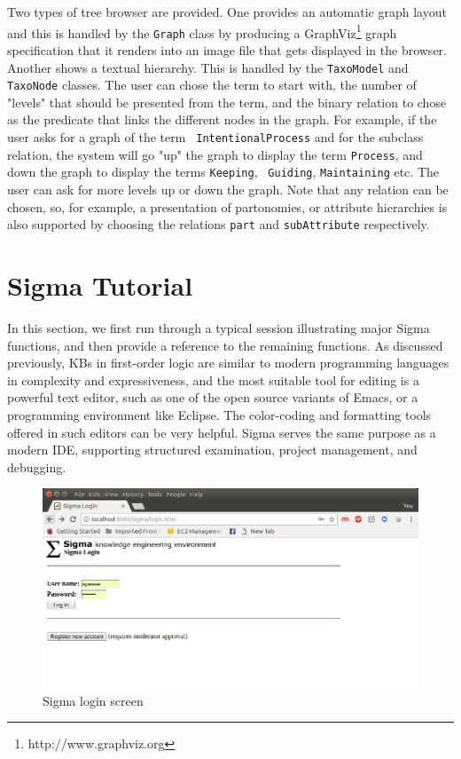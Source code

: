 \documentclass{book}
\begin{document}
Two types of tree browser are provided. One provides an automatic graph layout
and this is handled by the \texttt{Graph} class by
producing a GraphViz\footnote{http://www.graphviz.org} graph specification that
it renders into an image file that gets displayed in the browser. Another shows
a textual hierarchy. This is handled by the
\texttt{TaxoModel} and
\texttt{TaxoNode} classes. The user can chose the term
to start with, the number of "levels" that should be presented from the term,
and the binary relation to chose as the predicate that links the different nodes
in the graph. For example, if the user asks for a graph of the term {\tt
IntentionalProcess} and for the subclass relation, the
system will go "up" the graph to display the term {\tt Process}, and down the
graph to display the terms {\tt Keeping}, {\tt
Guiding}, {\tt Maintaining} etc. The user can
ask for more levels up or down the graph. Note that any relation can be chosen,
so, for example, a presentation of partonomies, or attribute
hierarchies is also supported by choosing the relations {\tt part}
and {\tt subAttribute} respectively.

\section{Sigma Tutorial}
\label{chap:KnowEngi:sec:Tuto}

In this section, we first run through a typical session illustrating major Sigma
functions, and then provide a reference to the remaining functions.  As
discussed previously, KBs in first-order logic are similar to modern programming
languages in complexity and expressiveness, and the most suitable tool for
editing is a powerful text editor, such as one of the open source variants of
Emacs, or a programming environment like Eclipse.
The color-coding and formatting tools offered in such editors can be very
helpful.  Sigma serves the same purpose as a modern IDE, supporting
structured examination, project management, and debugging.

\begin{figure}
  \centering
  \includegraphics[width=4.5in]{pictures/SigmaLogin.png}
  \caption{Sigma login screen}
  \label{fig:SigmaLogin}
\end{figure}
\end{document}
